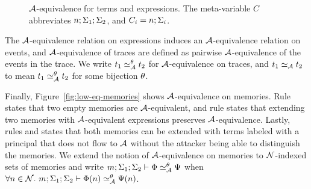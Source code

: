\begin{figure}
    \centering
    \caption{$\mathcal{A}$-equivalence for terms and expressions. The meta-variable $C$ abbreviates $n; \Sigma_1; \Sigma_2$, and $C_i = n; \Sigma_i$.}
    \label{fig:low-eq-expr}
\end{figure}

The $\mathcal{A}$-equivalence relation on expressions induces an $\mathcal{A}$-equivalence relation on events, and $\mathcal{A}$-equivalence of traces are defined as pairwise $\mathcal{A}$-equivalence of the events in the trace. We write $t_1 \simeq_{\mathcal{A}}^{\theta} t_2$ for $\mathcal{A}$-equivalence on traces, and $t_1 \simeq_{\mathcal{A}} t_2$ to mean $t_1 \simeq_{\mathcal{A}}^{\theta} t_2$ for some bijection $\theta$.

Finally, Figure~\ref{fig:low-eq-memories} shows $\mathcal{A}$-equivalence on memories. Rule  states that two empty memories are $\mathcal{A}$-equivalent, and rule  states that extending two memories with $\mathcal{A}$-equivalent expressions preserves $\mathcal{A}$-equivalence. Lastly, rules  and  states that both memories can be extended with terms labeled with a principal that does not flow to $\mathcal{A}$ without the attacker being able to distinguish the memories. We extend the notion of $\mathcal{A}$-equivalence on memories to $\mathcal{N}$-indexed sets of memories and write $\loweq{m; \env_1; \env_2}{\Attacker}[\bijection]{\globalstore}{\altglobalstore}$ when $\forall n \in \Nameset.~\loweq{m; \env_1; \env_2}{\Attacker}[\bijection]{\globalstore(n)}{\altglobalstore(n)}$.

